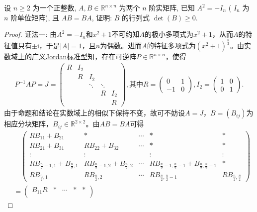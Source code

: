 \documentclass[../../main.tex]{subfiles}
\begin{document}
\begin{example}
设 \( n \geqslant 2 \) 为一个正整数, \( A,B \in \mathbb{R}^{n \times n} \) 为两个 \( n \) 阶实矩阵, 已知 \( A^2 = -I_n \) ( \( I_n \) 为 \( n \) 阶单位矩阵), 且 \( AB = BA \), 证明: \( B \) 的行列式 \( \det(B) \geqslant 0 \).
\end{example}
\begin{proof}
{\color{blue} 证法一:} 由\(A^2 = -I_n\)和\(x^2 + 1\)不可约知\(A\)的极小多项式为\(x^2 + 1\)，从而\(A\)的特征值只有\(\pm \mathrm{i}\)，于是\(|A| = 1\)，且\(n\)为偶数。进而\(A\)的特征多项式为\((x^2 + 1)^{\frac{n}{2}}\)。由\hyperref[theorem:实数域上的广义Jordan标准型]{实数域上的广义Jordan标准型}知，存在可逆阵\(P \in \mathbb{R}^{n \times n}\)，使得
\begin{align*}
P^{-1}AP = J = \begin{pmatrix}
R & I_2 &  &  &  \\
 & R & I_2 &  &  \\
 &  & \ddots & \ddots &  \\
 &  &  & R & I_2 \\
 &  &  &  & R
\end{pmatrix},\text{其中}R = \begin{pmatrix} 0 & 1 \\ -1 & 0 \end{pmatrix},I_2 = \begin{pmatrix} 1 & 0 \\ 0 & 1 \end{pmatrix}.
\end{align*}
由于命题和结论在实数域上的相似下保持不变，故可不妨设\(A = J\)，\(B = (B_{ij})\)为相应分块矩阵，\(B_{ij} \in \mathbb{R}^{2 \times 2}\)。由\(AB = BA\)可得
\begin{align}
&\quad \begin{pmatrix}
RB_{11} + B_{21} & * & \cdots & * & * \\
RB_{21} + B_{31} & RB_{22} + B_{32} & \cdots & * & * \\
\vdots & \vdots &  & \vdots & \vdots \\
RB_{\frac{n}{2}-1,1} + B_{\frac{n}{2},1} & RB_{\frac{n}{2}-1,2} + B_{\frac{n}{2},2} & \cdots & RB_{\frac{n}{2}-1,\frac{n}{2}-1} + B_{\frac{n}{2},\frac{n}{2}-1} & * \\
RB_{\frac{n}{2},1} & RB_{\frac{n}{2},2} & \cdots & RB_{\frac{n}{2},\frac{n}{2}-1} & RB_{\frac{n}{2},\frac{n}{2}}
\end{pmatrix}
\nonumber \\
&= \begin{pmatrix}
B_{11}R & * & \cdots & * & * \\

\end{pmatrix}
\end{align}
\end{proof}
\end{document}
